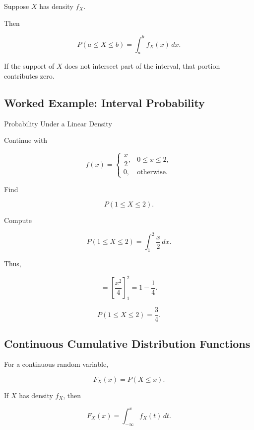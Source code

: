 Suppose \(X\) has density \(f_X\).

Then

\[
\boxed{
P(a\leq X\leq b)
=
\int_a^b f_X(x)\,dx.
}
\]

If the support of \(X\) does not intersect part of the interval, that
portion contributes zero.

\subsection{Worked Example: Interval Probability}
\label{subsec:worked-density-interval}

\begin{workedexamplebox}{Probability Under a Linear Density}

Continue with

\[
f(x)
=
\begin{cases}
\dfrac{x}{2},&0\leq x\leq2,\\
0,&\text{otherwise}.
\end{cases}
\]

Find

\[
P(1\leq X\leq2).
\]

Compute

\[
P(1\leq X\leq2)
=
\int_1^2\frac{x}{2}\,dx.
\]

Thus,

\[
=
\left[
\frac{x^2}{4}
\right]_1^2
=
1-\frac14.
\]

\begin{answerbox}
\[
\boxed{
P(1\leq X\leq2)
=
\frac34.
}
\]
\end{answerbox}

\end{workedexamplebox}

\subsection{Continuous Cumulative Distribution Functions}
\label{subsec:continuous-cumulative-distribution-functions}

For a continuous random variable,

\[
\boxed{
F_X(x)
=
P(X\leq x).
}
\]

If \(X\) has density \(f_X\), then

\[
\boxed{
F_X(x)
=
\int_{-\infty}^{x}
f_X(t)\,dt.
}
\]

